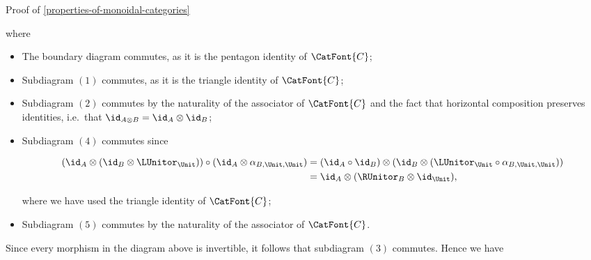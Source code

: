 \begin{Proof}{Proof of \cref{properties-of-monoidal-categories}}
\begin{scalemath}
    \end{scalemath}
    where
    \begin{itemize}
        \item The boundary diagram commutes, as it is the pentagon identity of $\CatFont{C}$;
        \item Subdiagram $(1)$ commutes, as it is the triangle identity of $\CatFont{C}$;
        \item Subdiagram $(2)$ commutes by the naturality of the associator of $\CatFont{C}$ and the fact that horizontal composition preserves identities, i.e.\ that $\id_{A\otimes B}=\id_{A}\otimes\id_{B}$;
        \item Subdiagram $(4)$ commutes since
            \begin{envsmallsize}
                \begin{align*}
                    (\id_{A}\otimes(\id_{B}\otimes\LUnitor_{\Unit}))\circ(\id_{A}\otimes\alpha_{B,\Unit,\Unit}) &= (\id_{A}\circ\id_{B})\otimes(\id_{B}\otimes(\LUnitor_{\Unit}\circ\alpha_{B,\Unit,\Unit}))\\
                                                                                                            &= \id_{A}\otimes(\RUnitor_{B}\otimes\id_{\Unit}),
                \end{align*}
            \end{envsmallsize}
            where we have used the triangle identity of $\CatFont{C}$;
        \item Subdiagram $(5)$ commutes by the naturality of the associator of $\CatFont{C}$.
    \end{itemize}
    Since every morphism in the diagram above is invertible, it follows that subdiagram $(3)$ commutes. Hence we have
    \begin{align*}

\end{align*}
\end{Proof}

